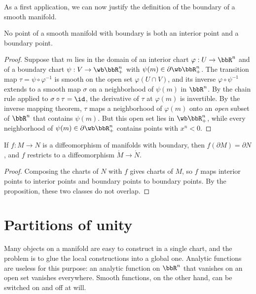 As a first application, we can now justify the definition of the boundary of a smooth manifold.

\begin{prop}\label{prop smooth invariance of boundary}
    No point of a smooth manifold with boundary is both an interior point and a boundary point.
\end{prop}
\begin{proof}
    Suppose that $m$ lies in the domain of an interior chart $\varphi:U\to\bbR^n$ and of a boundary chart $\psi:V\to\wb\bbR^n_+$ with $\psi(m)\in\partial\wb\bbR^n_+$. The transition map $\tau=\psi\circ\varphi^{-1}$ is smooth on the open set $\varphi(U\cap V)$, and its inverse $\varphi\circ\psi^{-1}$ extends to a smooth map $\sigma$ on a neighborhood of $\psi(m)$ in $\bbR^n$. By the chain rule applied to $\sigma\circ\tau=\id$, the derivative of $\tau$ at $\varphi(m)$ is invertible. By the inverse mapping theorem, $\tau$ maps a neighborhood of $\varphi(m)$ onto an \emph{open} subset of $\bbR^n$ that contains $\psi(m)$. But this open set lies in $\wb\bbR^n_+$, while every neighborhood of $\psi(m)\in\partial\wb\bbR^n_+$ contains points with $x^n<0$.
\end{proof}

\begin{cor}\label{cor diffeomorphisms preserve boundary}
    If $f:M\to N$ is a diffeomorphism of manifolds with boundary, then $f(\partial M)=\partial N$, and $f$ restricts to a diffeomorphism $\mathring M\to\mathring N$.
\end{cor}
\begin{proof}
    Composing the charts of $N$ with $f$ gives charts of $M$, so $f$ maps interior points to interior points and boundary points to boundary points. By the proposition, these two classes do not overlap.
\end{proof}


\section{Partitions of unity}\label{sec partitions of unity}

Many objects on a manifold are easy to construct in a single chart, and the problem is to glue the local constructions into a global one. Analytic functions are useless for this purpose: an analytic function on $\bbR^n$ that vanishes on an open set vanishes everywhere. Smooth functions, on the other hand, can be switched on and off at will.

